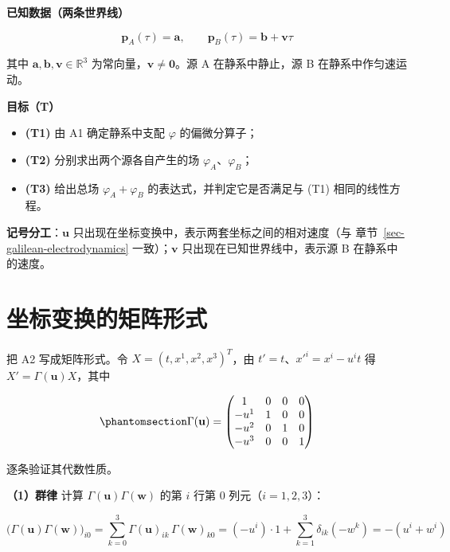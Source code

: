 \documentclass[
  chinese,
  a4paper,
  UTF8,
  12pt,
  oneside,
  openany]{ctexbook}
\providecommand{\tightlist}{%
  \setlength{\itemsep}{0pt}\setlength{\parskip}{0pt}}
\theoremstyle{plain}
\theoremstyle{plain}
\theoremstyle{plain}
\theoremstyle{definition}
\theoremstyle{plain}
\theoremstyle{plain}
\theoremstyle{remark}
\begin{document}
\textbf{已知数据（两条世界线）}

\[
\mathbf{p}_{A}(\tau)=\mathbf{a},\qquad \mathbf{p}_{B}(\tau)=\mathbf{b}+\mathbf{v}\tau
\]

其中 \(\mathbf{a},\mathbf{b},\mathbf{v}\in\mathbb{R}^{3}\)
为常向量，\(\mathbf{v}\neq\mathbf{0}\)。源 A 在静系中静止，源 B
在静系中作匀速运动。

\textbf{目标（T）}

\begin{itemize}
\tightlist
\item
  \textbf{(T1)} 由 A1 确定静系中支配 \(\varphi\) 的偏微分算子；
\item
  \textbf{(T2)} 分别求出两个源各自产生的场
  \(\varphi_{A}\)、\(\varphi_{B}\)；
\item
  \textbf{(T3)} 给出总场 \(\varphi_{A}+\varphi_{B}\)
  的表达式，并判定它是否满足与 (T1) 相同的线性方程。
\end{itemize}

\textbf{记号分工}：\(\mathbf{u}\)
只出现在坐标变换中，表示两套坐标之间的相对速度（与
章节~\ref{sec-galilean-electrodynamics} 一致）；\(\mathbf{v}\)
只出现在已知世界线中，表示源 B 在静系中的速度。

\section{坐标变换的矩阵形式}\label{sec-tsf-matrix}

把 A2 写成矩阵形式。令 \(X=(t,x^{1},x^{2},x^{3})^{T}\)，由
\(t'=t\)、\(x'^{i}=x^{i}-u^{i}t\) 得 \(X'=\Gamma(\mathbf{u})X\)，其中

\begin{equation}\protect\phantomsection\label{eq-galilei-matrix}{
\Gamma(\mathbf{u})=
\begin{pmatrix}
1&0&0&0\\
-u^{1}&1&0&0\\
-u^{2}&0&1&0\\
-u^{3}&0&0&1
\end{pmatrix}
}\end{equation}

逐条验证其代数性质。

\textbf{（1）群律} 计算 \(\Gamma(\mathbf{u})\Gamma(\mathbf{w})\) 的第
\(i\) 行第 \(0\) 列元（\(i=1,2,3\)）：

\[
\bigl(\Gamma(\mathbf{u})\Gamma(\mathbf{w})\bigr)_{i0}
=\sum_{k=0}^{3}\Gamma(\mathbf{u})_{ik}\,\Gamma(\mathbf{w})_{k0}
=(-u^{i})\cdot 1+\sum_{k=1}^{3}\delta_{ik}(-w^{k})
=-(u^{i}+w^{i})
\]
\end{document}
